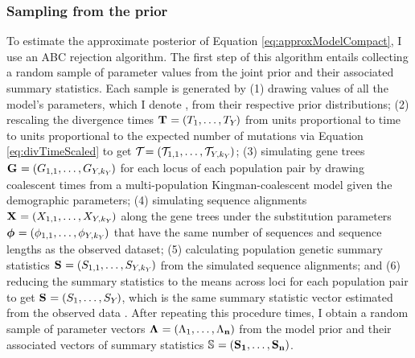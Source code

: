 \subsubsection{Sampling from the prior}
To estimate the approximate posterior of Equation \ref{eq:approxModelCompact},
I use an ABC rejection algorithm.
The first step of this algorithm entails collecting a random sample of
parameter values from the joint prior and their associated summary
statistics.
Each sample is generated by
(1) drawing values of all the model's parameters, which I denote \hpvector{},
from their respective prior distributions;
(2) rescaling the divergence times
$\mathbf{T_{}} = (T_{1}, \ldots, T_{Y_{}})$
from units proportional to time to units proportional to the expected number
of mutations via Equation \ref{eq:divTimeScaled} to get 
$\divTimeScaledVector = (\divTimeScaled{1}{1}, \ldots,
\divTimeScaled{\npairs{}}{\nloci{\npairs{}}})$;
(3) simulating gene trees $\geneTreeVector = (\geneTree{1}{1}, \ldots, 
\geneTree{\npairs{}}{\nloci{\npairs{}}})$
for each locus of each population pair by drawing coalescent times from
a multi-population Kingman-coalescent model given the demographic parameters;
(4) simulating sequence alignments 
$\alignmentVector = (\alignment{1}{1}, \ldots, \alignment{\npairs{}}{\nloci{\npairs{}}})$
along the gene trees under the
\hky substitution parameters
$\hkyModelVector = (\hkyModel{1}{1}, \ldots, \hkyModel{\npairs{}}{\nloci{\npairs{}}})$
that have the same number of sequences and sequence lengths as the observed
dataset;
(5) calculating population genetic summary statistics
$\ssVector{} = (\alignmentSS{1}{1}, \ldots, \alignmentSS{\npairs{}}{\nloci{\npairs{}}})$
from the simulated sequence alignments;
and (6) reducing the summary statistics to the means across loci for each
population pair to get
$\ssVector{} = (\alignmentSS{1}{}, \ldots, \alignmentSS{\npairs{}}{})$, which is
the same summary statistic vector estimated from the observed data \ssVectorObs.
After repeating this procedure \numPriorSamples times, I obtain a random
sample of parameter vectors
$\boldsymbol{\Lambda_{}} = (\Lambda_{1}, \ldots, \Lambda_{\mathbf{n}})$
from the model prior and their associated vectors of summary statistics
$\ssMatrix = (\ssVector{1}, \ldots, \ssVector{\numPriorSamples})$.

